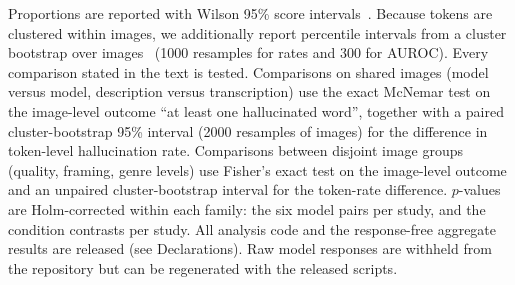 Proportions are reported with Wilson 95\% score intervals~\cite{wilson1927probable}. Because tokens are clustered within images, we additionally report percentile intervals from a cluster bootstrap over images~\cite{efron1979bootstrap} (1000 resamples for rates and 300 for AUROC). Every comparison stated in the text is tested. Comparisons on shared images (model versus model, description versus transcription) use the exact McNemar test on the image-level outcome ``at least one hallucinated word'', together with a paired cluster-bootstrap 95\% interval (2000 resamples of images) for the difference in token-level hallucination rate. Comparisons between disjoint image groups (quality, framing, genre levels) use Fisher's exact test on the image-level outcome and an unpaired cluster-bootstrap interval for the token-rate difference. $p$-values are Holm-corrected within each family: the six model pairs per study, and the condition contrasts per study. All analysis code and the response-free aggregate results are released (see Declarations). Raw model responses are withheld from the repository but can be regenerated with the released scripts.
